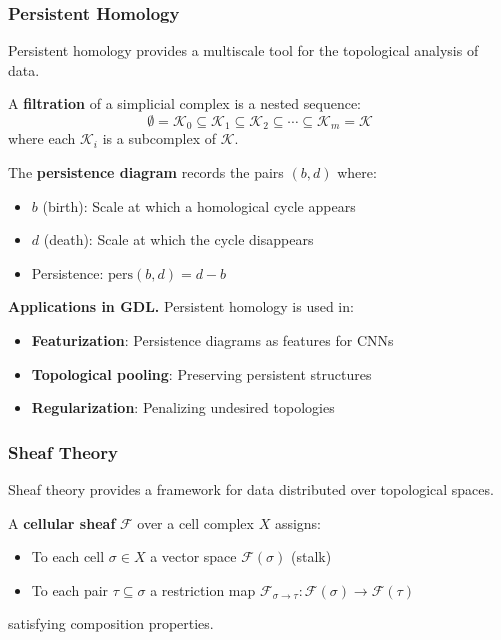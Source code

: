 \subsubsection{Persistent Homology}

Persistent homology provides a multiscale tool for the topological analysis of data.

\begin{definition}[Filtration]\label{def:filtracion_cnn}
A \textbf{filtration} of a simplicial complex is a nested sequence:
\[\emptyset = \mathcal{K}_0 \subseteq \mathcal{K}_1 \subseteq \mathcal{K}_2 \subseteq \cdots \subseteq \mathcal{K}_m = \mathcal{K}\]
where each $\mathcal{K}_i$ is a subcomplex of $\mathcal{K}$.
\end{definition}

\begin{definition}\label{def:diagrama_persistencia_cnn}
The \textbf{persistence diagram} records the pairs $(b, d)$ where:
\begin{itemize}
    \item $b$ (birth): Scale at which a homological cycle appears
    \item $d$ (death): Scale at which the cycle disappears
    \item Persistence: $\text{pers}(b,d) = d - b$
\end{itemize}
\end{definition}

\textbf{Applications in GDL.}\label{rem:persistencia_gdl} Persistent homology is used in:
\begin{itemize}
    \item \textbf{Featurization}: Persistence diagrams as features for CNNs
    \item \textbf{Topological pooling}: Preserving persistent structures
    \item \textbf{Regularization}: Penalizing undesired topologies
\end{itemize}

\subsubsection{Sheaf Theory}

Sheaf theory provides a framework for data distributed over topological spaces.

\begin{definition}\label{def:sheaf_celular}
A \textbf{cellular sheaf} $\mathcal{F}$ over a cell complex $X$ assigns:
\begin{itemize}
    \item To each cell $\sigma \in X$ a vector space $\mathcal{F}(\sigma)$ (stalk)
    \item To each pair $\tau \subseteq \sigma$ a restriction map $\mathcal{F}_{\sigma \to \tau}: \mathcal{F}(\sigma) \to \mathcal{F}(\tau)$
\end{itemize}
satisfying composition properties.
\end{definition}

